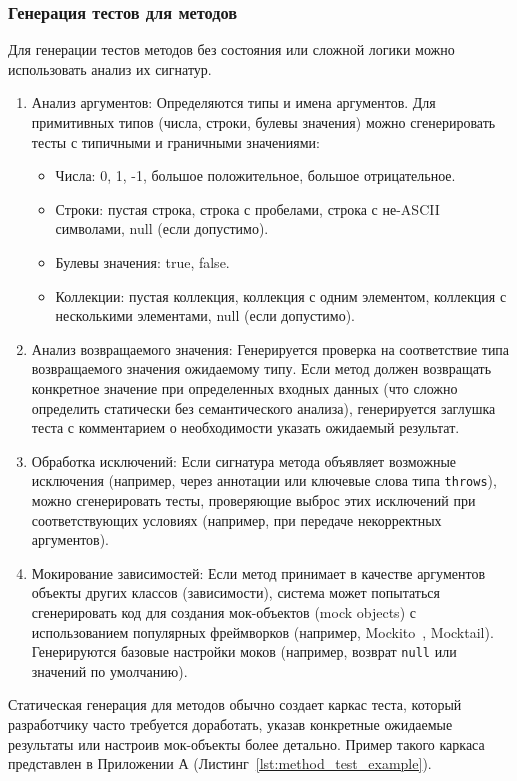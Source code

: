 \documentclass[14pt, russian]{scrartcl}
\begin{document}
\subsubsection{Генерация тестов для методов}

Для генерации тестов методов без состояния или сложной логики можно использовать анализ их сигнатур.

\begin{enumerate}
    \item {Анализ аргументов:} Определяются типы и имена аргументов. Для примитивных типов (числа, строки, булевы значения) можно сгенерировать тесты с типичными и граничными значениями:
        \begin{itemize}
            \item Числа: 0, 1, -1, большое положительное, большое отрицательное.
            \item Строки: пустая строка, строка с пробелами, строка с не-ASCII символами, null (если допустимо).
            \item Булевы значения: true, false.
            \item Коллекции: пустая коллекция, коллекция с одним элементом, коллекция с несколькими элементами, null (если допустимо).
        \end{itemize}
    \item {Анализ возвращаемого значения:} Генерируется проверка на соответствие типа возвращаемого значения ожидаемому типу. Если метод должен возвращать конкретное значение при определенных входных данных (что сложно определить статически без семантического анализа), генерируется заглушка теста с комментарием о необходимости указать ожидаемый результат.
    \item {Обработка исключений:} Если сигнатура метода объявляет возможные исключения (например, через аннотации или ключевые слова типа \texttt{throws}), можно сгенерировать тесты, проверяющие выброс этих исключений при соответствующих условиях (например, при передаче некорректных аргументов).
    \item {Мокирование зависимостей:} Если метод принимает в качестве аргументов объекты других классов (зависимости), система может попытаться сгенерировать код для создания мок-объектов (mock objects) с использованием популярных фреймворков (например, Mockito~\cite{MockitoDart}, Mocktail). Генерируются базовые настройки моков (например, возврат \texttt{null} или значений по умолчанию).
\end{enumerate}

Статическая генерация для методов обычно создает каркас теста, который разработчику часто требуется доработать, указав конкретные ожидаемые результаты или настроив мок-объекты более детально. Пример такого каркаса представлен в Приложении А (Листинг~\ref{lst:method_test_example}).
\end{document}
